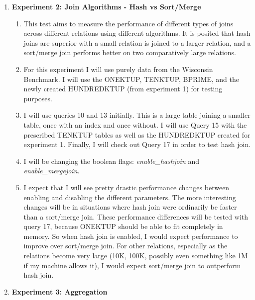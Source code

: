 \documentclass[11pt,letterpaper]{article}
\begin{document}
\begin{enumerate}
\begin{enumerate}
\begin{enumerate}
	\end{enumerate}
	 
	\item \textbf{Experiment 2: Join Algorithms - Hash vs Sort/Merge}
	
	\begin{enumerate}
		
	 	\item This test aims to measure the performance of different types of joins across different relations using different algorithms.  It is posited that hash joins are superior with a small relation is joined to a larger relation, and a sort/merge join performs better on two comparatively large relations.  
	 	\item For this experiment I will use purely data from the Wisconsin Benchmark.  I will use the ONEKTUP, TENKTUP, BPRIME, and the newly created HUNDREDKTUP (from experiment 1) for testing purposes. 
	 	\item I will use queries 10 and 13 initially.  This is a large table joining a smaller table, once with an index and once without. I will use Query 15 with the prescribed TENKTUP tables as well as the HUNDREDKTUP created for experiment 1.  Finally, I will check out Query 17 in order to test hash join. 
	 	\item I will be changing the boolean flags:  \textit{enable\_hashjoin} and \textit{enable\_mergejoin}. 
	 	\item I expect that I will see pretty drastic performance changes between enabling and disabling the different parameters. The more interesting changes will be in situations where hash join were ordinarily be faster than a sort/merge join.  These performance differences will be tested with query 17, because ONEKTUP should be able to fit completely in memory.  So when hash join is enabled, I would expect performance to improve over sort/merge join.  For other relations, especially as the relations become very large (10K, 100K, possibly even something like 1M if my machine allows it), I would expect sort/merge join to outperform hash join.
	 	
	\end{enumerate}

 	\item \textbf{Experiment 3: Aggregation}
 	
 	\begin{enumerate}
 		

\end{enumerate}
\end{enumerate}
\end{enumerate}
\end{document}
